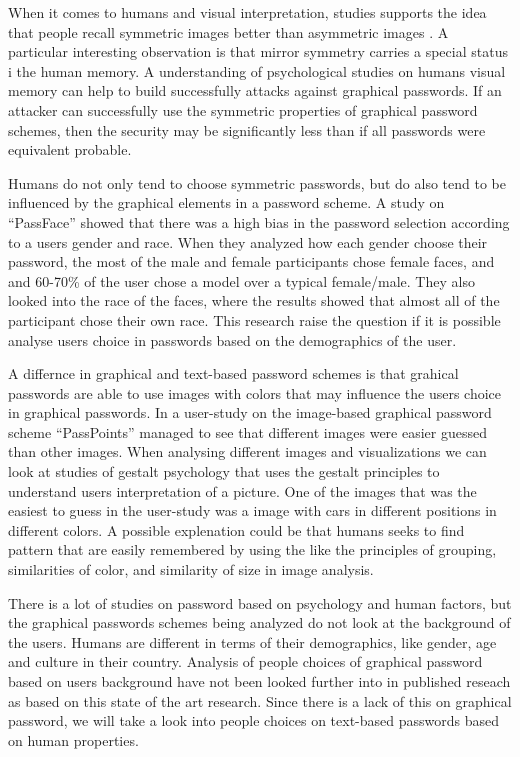   When it comes to humans and visual interpretation, studies supports the idea that people recall symmetric images better than asymmetric images \cite{Attneave, French}. A particular interesting observation is that mirror symmetry carries a special status i the human memory\cite{Wagemans}. A understanding of psychological studies on humans visual memory can help to build successfully attacks against graphical passwords. If an attacker can successfully use the symmetric properties of graphical password schemes, then the security may be significantly less than if all passwords were equivalent probable. 

  Humans do not only tend to choose symmetric passwords, but do also tend to be influenced by the graphical elements in a password scheme. A study on ``PassFace'' \cite{Davis} showed that there was a high bias in the password selection according to a users gender and race. When they analyzed how each gender choose their password, the most of the male and female participants chose female faces, and and 60-70\% of the user chose a model over a typical female/male. They also looked into the race of the faces, where the results showed that almost all of the participant chose their own race. This research raise the question if it is possible analyse users choice in passwords based on the demographics of the user.

  A differnce in graphical and text-based password schemes is that grahical passwords are able to use images with colors that may influence the users choice in graphical passwords. In a user-study \cite{Thorpe} on the image-based graphical password scheme ``PassPoints'' managed to see that different images were easier guessed than other images. When analysing different images and visualizations we can look at studies of gestalt psychology \cite{Wagemans} that uses the gestalt principles to understand users interpretation of a picture. One of the images that was the easiest to guess in the user-study was a image with cars in different positions in different colors. A possible explenation could be that humans seeks to find pattern that are easily remembered by using the like the principles of grouping, similarities of color, and similarity of size in image analysis.

  There is a lot of studies on password based on psychology and human factors, but the graphical passwords schemes being analyzed do not look at the background of the users. Humans are different in terms of their demographics, like gender, age and culture in their country. Analysis of people choices of graphical password based on users background have not been looked further into in published reseach as based on this state of the art research. Since there is a lack of this on graphical password, we will take a look into people choices on text-based passwords based on human properties. 

